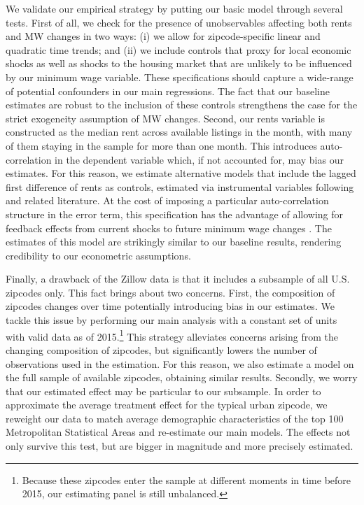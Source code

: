 We validate our empirical strategy by putting our basic model through several tests. First of 
all, we check for the presence of unobservables affecting both rents and MW changes in two ways: 
(i) we allow for zipcode-specific linear and quadratic time trends; and (ii) we include 
controls that proxy for local economic shocks as well as shocks to the housing market that are 
unlikely to be influenced by our minimum wage variable.
These specifications should capture a wide-range of potential confounders in our main 
regressions. The fact that our baseline estimates are robust to the inclusion of these 
controls strengthens the case for the strict exogeneity assumption of MW changes. Second, 
our rents variable is constructed as the median rent across available listings in the month, 
with many of them staying in the sample for more than one month. This introduces 
auto-correlation in the dependent variable which, if not accounted for, may bias our estimates. 
For this reason, we estimate alternative models that include the lagged first difference of rents 
as controls, estimated via instrumental variables following \textcite{ArellanoBond1991} and 
related literature. At the cost of imposing a particular auto-correlation structure in the 
error term, this specification has the advantage of allowing for feedback effects from current 
shocks to future minimum wage changes \parencite{ArellanoHonore2001}. The estimates of this 
model are strikingly similar to our baseline results, rendering credibility to our econometric 
assumptions.

Finally, a drawback of the Zillow data is that it includes a subsample of all U.S. zipcodes 
only. This fact brings about two concerns. First, the composition of zipcodes changes over 
time potentially introducing bias in our estimates. We tackle this issue by performing our 
main analysis with a constant set of units with valid data as of 2015.\footnote{Because these 
	zipcodes enter the sample at different moments in time before 2015, our estimating panel 
	is still unbalanced.}
This strategy alleviates concerns arising from the changing composition of zipcodes, but 
significantly lowers the number of observations used in the estimation. For this reason, we 
also estimate a model on the full sample of available zipcodes, obtaining similar results. 
Secondly, we worry that our estimated effect may be particular to our subsample. In order to 
approximate the average treatment effect for the typical urban zipcode, we reweight our data to 
match average demographic characteristics of the top 100 Metropolitan Statistical Areas 
and re-estimate our main models. The effects not only survive this test, but are bigger in 
magnitude and more precisely estimated.

